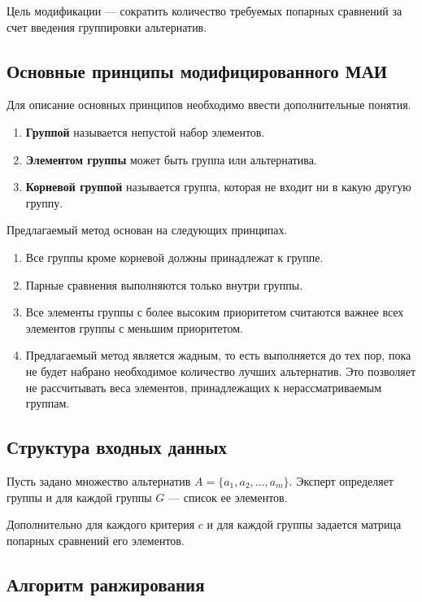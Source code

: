 Цель модификации --- сократить количество требуемых попарных сравнений за счет введения группировки альтернатив.
\clearpage
\subsection*{Основные принципы модифицированного МАИ}

Для описание основных принципов необходимо ввести дополнительные понятия.
\begin{enumerate}
    \item \textbf{Группой} называется непустой набор элементов. 
    \item \textbf{Элементом группы} может быть группа или альтернатива.
    \item \textbf{Корневой группой} называется группа, которая не входит ни в какую другую группу.
\end{enumerate}

Предлагаемый метод основан на следующих принципах.

\begin{enumerate}
    \item Все группы кроме корневой должны принадлежат к группе.
    \item Парные сравнения выполняются только внутри группы.
    \item Все элементы группы с более высоким приоритетом считаются важнее всех элементов группы с меньшим приоритетом.
    \item Предлагаемый метод является жадным, то есть выполняется до тех пор, пока не будет набрано необходимое количество лучших альтернатив. Это позволяет не рассчитывать веса элементов, принадлежащих к нерассматриваемым группам.
\end{enumerate}

\subsection*{Структура входных данных}

Пусть задано множество альтернатив \(A = \{a_1, a_2, \dots, a_m\}\). 
Эксперт определяет группы и для каждой группы \(G\) --- список ее элементов.

Дополнительно для каждого критерия \(c\) и для каждой группы задается матрица попарных сравнений его элементов.

\subsection*{Алгоритм ранжирования}

